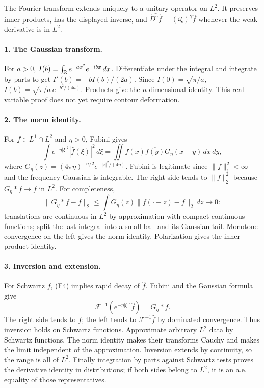 \begin{theorem}
The Fourier transform extends uniquely to a unitary operator on $L^2$.
It preserves inner products, has the displayed inverse, and
$\widehat{D^\gamma f}=(i\xi)^\gamma\widehat f$ whenever
the weak derivative is in $L^2$.
\end{theorem}
\begin{expandedproof}
\paragraph{1. The Gaussian transform.}
For $a>0$, $I(b)=\int_{\mathbb{R}} e^{-ax^2}e^{-ibx}\,dx$.
Differentiate under the integral and integrate by parts to get
$I'(b)=-bI(b)/(2a)$.
Since $I(0)=\sqrt{\pi/a}$,
$I(b)=\sqrt{\pi/a}\,e^{-b^2/(4a)}$.
Products give the $n$-dimensional identity.
This real-variable proof does not yet require contour deformation.

\paragraph{2. The norm identity.}
For $f\in L^1\cap L^2$ and $\eta>0$, Fubini gives
\[
 \int e^{-\eta|\xi|^2}|\widehat f(\xi)|^2\,d\xi
 =\iint f(x)\overline{f(y)}G_\eta(x-y)\,dx\,dy,
\]
where $G_\eta(z)=(4\pi\eta)^{-n/2}e^{-|z|^2/(4\eta)}$.
Fubini is legitimate since $\|f\|_1^2<\infty$ and the frequency
Gaussian is integrable.
The right side tends to $\|f\|_2^2$ because $G_\eta*f\to f$ in $L^2$.
For completeness,
\[
 \|G_\eta*f-f\|_2
 \leq\int G_\eta(z)\|f(\cdot-z)-f\|_2\,dz\longrightarrow0:
\]
translations are continuous in $L^2$ by approximation with compact
continuous functions; split the last integral into a small ball and
its Gaussian tail. Monotone convergence on the left gives the norm identity.
Polarization gives the inner-product identity.

\paragraph{3. Inversion and extension.}
For Schwartz $f$, (F4) implies rapid decay of $\widehat f$.
Fubini and the Gaussian formula give
\[
 \mathcal F^{-1}(e^{-\eta|\xi|^2}\widehat f)=G_\eta*f.
\]
The right side tends to $f$; the left tends to
$\mathcal F^{-1}\widehat f$ by dominated convergence.
Thus inversion holds on Schwartz functions.
Approximate arbitrary $L^2$ data by Schwartz functions.
The norm identity makes their transforms Cauchy and makes the limit
independent of the approximation. Inversion extends by continuity,
so the range is all of $L^2$.
Finally integration by parts against Schwartz tests proves the derivative
identity in distributions; if both sides belong to $L^2$, it is an
a.e. equality of those representatives.
\end{expandedproof}
\Needspace{45mm}


